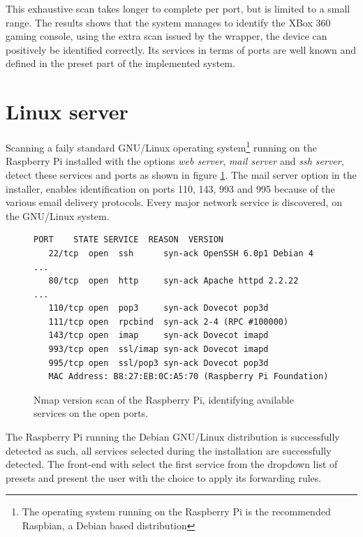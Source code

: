 \documentclass[a4paper,11pt,makeidx]{kth-bcs}
\begin{document}
This exhaustive scan takes longer to complete per port, but is limited to a small range.
The results shows that the system manages to identify the XBox 360 gaming console, using the extra scan issued by the wrapper, the device can positively be identified correctly.
Its services in terms of ports are well known and defined in the preset part of the implemented system.

\section{Linux server}
Scanning a faily standard GNU/Linux operating system\footnote{The operating system running on the Raspberry Pi is the recommended Raspbian, a Debian based distribution} running on the Raspberry Pi installed with the options \emph{web server}, \emph{mail server} and \emph{ssh server}, detect these services and ports as shown in figure \ref{fig:rasp_scan}.
The mail server option in the installer, enables identification on ports 110, 143, 993 and 995 because of the various email delivery protocols.
Every major network service is discovered, on the GNU/Linux system.

\begin{figure}[h]
   \centering
   \label{fig:rasp_scan}
   \begin{lstlisting}[escapechar=!]
   PORT    STATE SERVICE  REASON  VERSION
   22/tcp  open  ssh      syn-ack OpenSSH 6.0p1 Debian 4 ...
   80/tcp  open  http     syn-ack Apache httpd 2.2.22    ...
   110/tcp open  pop3     syn-ack Dovecot pop3d
   111/tcp open  rpcbind  syn-ack 2-4 (RPC #100000)
   143/tcp open  imap     syn-ack Dovecot imapd
   993/tcp open  ssl/imap syn-ack Dovecot imapd
   995/tcp open  ssl/pop3 syn-ack Dovecot pop3d
   MAC Address: B8:27:EB:0C:A5:70 (Raspberry Pi Foundation)
   \end{lstlisting}
   \caption{
      \small{
         Nmap version scan of the Raspberry Pi, identifying available services on the open ports.
      }
   }
\end{figure}
The Raspberry Pi running the Debian GNU/Linux distribution is successfully detected as such, all services selected during the installation are successfully detected.
The front-end with select the first service from the dropdown list of presets and present the user with the choice to apply its forwarding rules.
\end{document}
